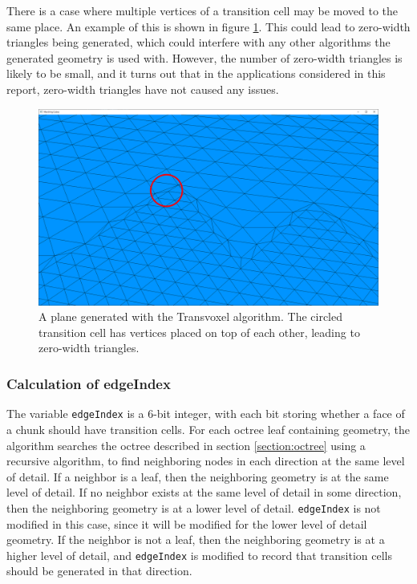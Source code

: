 \documentclass[11pt]{article}
\begin{document}
\begin{enumerate}
There is a case where multiple vertices of a transition cell may be moved to the same place. An example of this is shown in figure \ref{fig:tv_transition_plane}. This could lead to zero-width triangles being generated, which could interfere with any other algorithms the generated geometry is used with. However, the number of zero-width triangles is likely to be small, and it turns out that in the applications considered in this report, zero-width triangles have not caused any issues.

\begin{figure}[H]
  \includegraphics[width=\textwidth]{tv_transition_plane}
  \caption{A plane generated with the Transvoxel algorithm. The circled transition cell has vertices placed on top of each other, leading to zero-width triangles.}
  \label{fig:tv_transition_plane}
\end{figure}

\end{enumerate}

\subsubsection{Calculation of edgeIndex}
\label{section:edgeIndex}

The variable \texttt{edgeIndex} is a 6-bit integer, with each bit storing whether a face of a chunk should have transition cells. For each octree leaf containing geometry, the algorithm searches the octree described in section \ref{section:octree} using a recursive algorithm, to find neighboring nodes in each direction at the same level of detail. If a neighbor is a leaf, then the neighboring geometry is at the same level of detail. If no neighbor exists at the same level of detail in some direction, then the neighboring geometry is at a lower level of detail. \texttt{edgeIndex} is not modified in this case, since it will be modified for the lower level of detail geometry. If the neighbor is not a leaf, then the neighboring geometry is at a higher level of detail, and \texttt{edgeIndex} is modified to record that transition cells should be generated in that direction.
\end{document}

